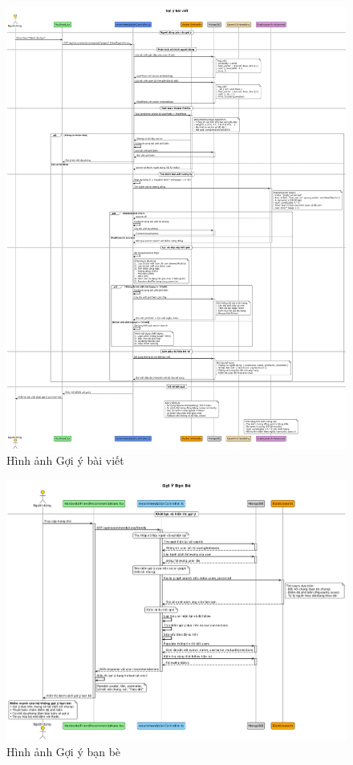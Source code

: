 \begin{figure}[H]
    \centering
    \includegraphics[width=1\textwidth]{image/sequence/goi-y-bai-viet.png}
    \caption{Hình ảnh Gợi ý bài viết}
    \label{fig:goi_y_bai_viet}
\end{figure}

\begin{figure}[H]
    \centering
    \includegraphics[width=1\textwidth]{image/sequence/goi-y-ban-be.png}
    \caption{Hình ảnh Gợi ý bạn bè}
    \label{fig:goi_y_ban_be}
\end{figure}


